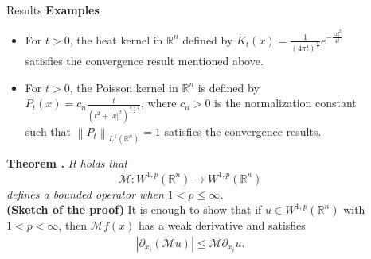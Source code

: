 \documentclass[final]{beamer}
\providecommand{\norm}[1]{\left\|#1\right\|}
\newlength{\sepwidth}
\newlength{\colwidth}
\newcommand{\separatorcolumn}{\begin{column}{\sepwidth}\end{column}}
\begin{document}
\begin{frame}[t]
\begin{columns}[t]
\begin{column}{\colwidth}
\begin{alertblock}{Results}
    \textbf{Examples}\\
    \begin{itemize}
      \item For $t>0$, the heat kernel in $\mathbb{R}^{n}$ defined by $K_{t}(x)=\frac{1}{(4\pi t)^{\frac{n}{2}}}e^{-\frac{|x|^{2}}{4t}}$ satisfies the convergence result mentioned above.
      \item For $t>0$, the Poisson kernel in $\mathbb{R}^{n}$ is defined by $P_{t}(x)=c_{n}\frac{t}{\left(t^{2}+|x|^{2}\right)^{\frac{n+1}{2}}}$, where $c_{n}>0$ is the normalization constant such that $\norm{P_{t}}_{L^{1}(\mathbb{R}^{n})}=1$ satisfies the convergence results. 
    \end{itemize}
    \textbf{Theorem \cite{MR1469106}.} \emph{It holds that
    \begin{equation*}
      \mathcal{M}:W^{1,p}(\mathbb{R}^n)\rightarrow W^{1,p}(\mathbb{R}^n)
    \end{equation*}
    defines a bounded operator when $1<p\leq \infty$.}\\
    \textbf{(Sketch of the proof)} It is enough to show that if $u\in W^{1,p}(\mathbb{R}^{n})$ with $1<p< \infty$, then $\mathcal{M}f(x)$ has a weak derivative and satisfies
    \begin{align*}
      |\partial_{x_i}(\mathcal{M}u)|\leq \mathcal{M}\partial_{x_i}u.
    \end{align*}
  \end{alertblock}
\end{column}

\separatorcolumn

\begin{column}{\colwidth}


\end{column}
\end{columns}
\end{frame}
\end{document}
